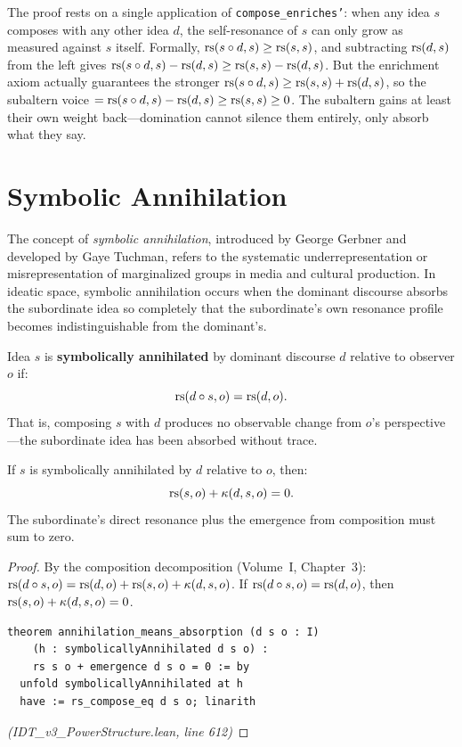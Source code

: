 \begin{remark}
The proof rests on a single application of \texttt{compose\_enriches'}: when
any idea $s$ composes with any other idea $d$, the self-resonance of $s$ can
only grow as measured against $s$ itself. Formally,
$\mathrm{rs}(s \circ d, s) \geq \mathrm{rs}(s, s)$, and subtracting $\mathrm{rs}(d, s)$ from the
left gives $\mathrm{rs}(s \circ d, s) - \mathrm{rs}(d, s) \geq \mathrm{rs}(s,s) - \mathrm{rs}(d,s)$.
But the enrichment axiom actually guarantees the stronger
$\mathrm{rs}(s \circ d, s) \geq \mathrm{rs}(s,s) + \mathrm{rs}(d,s)$, so the subaltern voice
$= \mathrm{rs}(s \circ d, s) - \mathrm{rs}(d,s) \geq \mathrm{rs}(s,s) \geq 0$. The subaltern
gains at least their own weight back---domination cannot silence them
entirely, only absorb what they say.
\end{remark}

\section{Symbolic Annihilation}

The concept of \emph{symbolic annihilation}, introduced by George Gerbner and
developed by Gaye Tuchman, refers to the systematic underrepresentation or
misrepresentation of marginalized groups in media and cultural production.
In ideatic space, symbolic annihilation occurs when the dominant discourse
absorbs the subordinate idea so completely that the subordinate's own
resonance profile becomes indistinguishable from the dominant's.

\begin{definition}
\label{def:symbolic-annihilation}
Idea $s$ is \textbf{symbolically annihilated} by dominant discourse $d$
relative to observer $o$ if:
\[
  \mathrm{rs}(d \circ s, o) = \mathrm{rs}(d, o).
\]
That is, composing $s$ with $d$ produces no observable change from $o$'s
perspective---the subordinate idea has been absorbed without trace.
\end{definition}

\begin{theorem}
\label{thm:annihilation-absorption}
If $s$ is symbolically annihilated by $d$ relative to $o$, then:
\[
  \mathrm{rs}(s, o) + \kappa(d, s, o) = 0.
\]
The subordinate's direct resonance plus the emergence from composition must
sum to zero.
\end{theorem}

\begin{proof}
By the composition decomposition (Volume~I, Chapter~3):
$\mathrm{rs}(d \circ s, o) = \mathrm{rs}(d, o) + \mathrm{rs}(s, o) + \kappa(d, s, o)$.
If $\mathrm{rs}(d \circ s, o) = \mathrm{rs}(d, o)$, then $\mathrm{rs}(s, o) + \kappa(d, s, o) = 0$.
\begin{lstlisting}
theorem annihilation_means_absorption (d s o : I)
    (h : symbolicallyAnnihilated d s o) :
    rs s o + emergence d s o = 0 := by
  unfold symbolicallyAnnihilated at h
  have := rs_compose_eq d s o; linarith
\end{lstlisting}
\textit{(IDT\_v3\_PowerStructure.lean, line 612)}
\end{proof}

